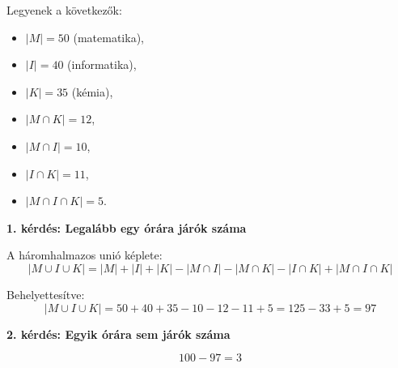 \begin{solution}
Legyenek a következők:
\begin{itemize}
\item $|M|=50$ (matematika), 
\item $|I|=40$ (informatika), 
\item $|K|=35$ (kémia), 
\item $|M\cap K|=12$, 
\item $|M\cap I|=10$, 
\item $|I\cap K|=11$, 
\item $|M\cap I\cap K|=5$. 
\end{itemize}
\end{solution}
\medskip{}

\textbf{1. kérdés: Legalább egy órára járók száma}

A háromhalmazos unió képlete: 
\[
|M\cup I\cup K|=|M|+|I|+|K|-|M\cap I|-|M\cap K|-|I\cap K|+|M\cap I\cap K|
\]

Behelyettesítve: 
\[
|M\cup I\cup K|=50+40+35-10-12-11+5=125-33+5=\boxed{97}
\]

\medskip{}

\textbf{2. kérdés: Egyik órára sem járók száma}

\[
100-97=\boxed{3}
\]

